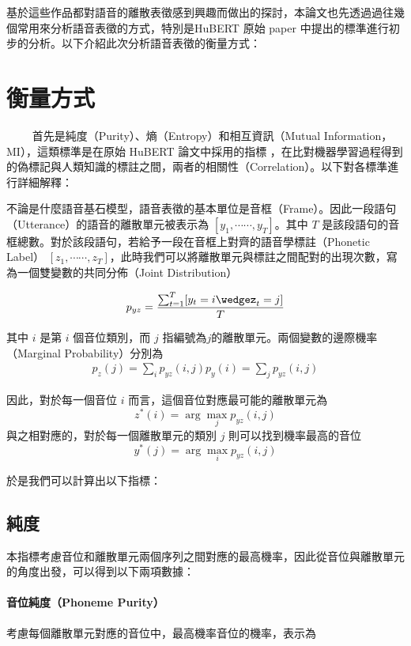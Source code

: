基於這些作品都對語音的離散表徵感到興趣而做出的探討，本論文也先透過過往幾個常用來分析語音表徵的方式，特別是HuBERT 原始 paper 中提出的標準進行初步的分析。以下介紹此次分析語音表徵的衡量方式：

\section{衡量方式}

　　
首先是純度（Purity）、熵（Entropy）和相互資訊（Mutual Information，MI），這類標準是在原始 HuBERT 論文中採用的指標 \cite{hsu_hubert_2021, hsu_hubert_2021-2}，在比對機器學習過程得到的偽標記與人類知識的標註之間，兩者的相關性（Correlation）。以下對各標準進行詳細解釋：


不論是什麼語音基石模型，語音表徵的基本單位是音框（Frame）。因此一段語句（Utterance）的語音的離散單元被表示為 $[y_1, \cdots\cdots, y_T]$。其中 $T$ 是該段語句的音框總數。對於該段語句，若給予一段在音框上對齊的語音學標註（Phonetic Label）
$[z_1, \cdots\cdots, z_T]$，此時我們可以將離散單元與標註之間配對的出現次數，寫為一個雙變數的共同分佈（Joint Distribution）

$$p_{yz} = \frac{\sum^T_{t=1}[{y_t = i \wedgez_t = j}]}{T}$$

其中 $i$ 是第 $i$ 個音位類別，而 $j$ 指編號為$j$的離散單元。兩個變數的邊際機率（Marginal Probability）分別為
\begin{align}
    p_z(j)=\sum_i{p_{yz}(i, j)}
p_y(i)=\sum_j{p_{yz}(i, j)}
\end{align}

因此，對於每一個音位 $i$ 而言，這個音位對應最可能的離散單元為
 $$z^\ast(i) = \arg\max_j p_{yz}(i, j)$$
與之相對應的，對於每一個離散單元的類別 $j$ 則可以找到機率最高的音位
$$y^\ast(j) = \arg\max_i p_{yz}(i,j)$$

於是我們可以計算出以下指標：

\subsection{純度}

本指標考慮音位和離散單元兩個序列之間對應的最高機率，因此從音位與離散單元的角度出發，可以得到以下兩項數據：


\paragraph{音位純度（Phoneme Purity）}
考慮每個離散單元對應的音位中，最高機率音位的機率，表示為



